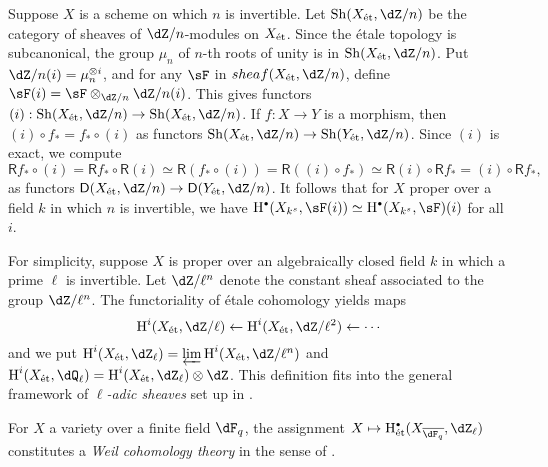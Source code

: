 \documentclass{article}
\begin{document}
Suppose $X$ is a scheme on which $n$ is invertible. Let $\sheaf(\et X,\dZ/n)$ 
be the category of sheaves of $\dZ/n$-modules on ${X}_\textnormal{\'et}$. Since the \'etale 
topology is subcanonical, the group $\mu_n$ of $n$-th roots of unity is in 
$\sheaf(\et X,\dZ/n)$. Put $\dZ/n(i) = \mu_n^{\otimes i}$, and for any $\sF$ in 
$sheaf(\et X,\dZ/n)$, define $\sF(i) = \sF\otimes_{\dZ/n}\dZ/n(i)$. This gives 
functors $(i):\sheaf(\et X,\dZ/n) \to \sheaf(\et X,\dZ/n)$. If $f:X\to Y$ is a 
morphism, then $(i)\circ f_\ast=f_\ast\circ (i)$ as functors 
$\sheaf(\et X,\dZ/n) \to \sheaf(\et Y,\dZ/n)$. Since $(i)$ is exact, we compute  
\[
  \mathsf R f_\ast \circ (i) = \mathsf R f_\ast \circ \mathsf R (i) \simeq \mathsf R(f_\ast \circ(i)) = \mathsf R((i)\circ f_\ast)\simeq  \mathsf R(i)\circ \mathsf R f_\ast = (i)\circ \mathsf R f_\ast \text{,}
\]
as functors $\mathsf D(\et X,\dZ/n) \to \mathsf D(\et Y,\dZ/n)$. It follows 
that for $X$ proper over a field $k$ in which $n$ is invertible, we have 
$\h^\bullet(X_{k^s},\sF(i)) \simeq \h^\bullet(X_{k^s},\sF)(i)$ for all $i$. 

For simplicity, suppose $X$ is proper over an algebraically closed field $k$ in 
which a prime $\ell$ is invertible. Let $\dZ/\ell^n$ denote the constant sheaf 
associated to the group $\dZ/\ell^n$. The functoriality of \'etale cohomology 
yields maps 
\[
  \h^i(\et X,\dZ/\ell) \leftarrow \h^i(\et X,\dZ/\ell^2) \leftarrow \cdots 
\]
and we put $\h^i(\et X,\dZ_\ell) = \varprojlim \h^i(\et X,\dZ/\ell^n)$ and 
$\h^i(\et X,\dQ_\ell) = \h^i(\et X,\dZ_\ell)\otimes \dZ$. This definition fits 
into the general framework of \emph{$\ell$-adic sheaves} set up in \cite{de80}. 

For $X$ a variety over a finite field $\dF_q$, the assignment  
$X\mapsto \h_\text{\'et}^\bullet(X_{\overline{\dF_q}},\dZ_\ell)$ constitutes a 
\emph{Weil cohomology theory} in the sense of \cite[3.3]{an04}. 












\end{document}
